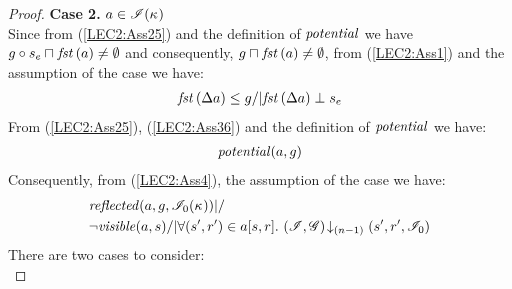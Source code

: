 \begin{lemma}
\begin{proof}
\noindent\textbf{Case 2. }$a \in \mathscr{I}(\kappa_{})$\\
Since from (\ref{LEC2:Ass25}) and the definition of $\mathit{potential}$ we have $g \circ s_e \sqcap_{} \mathit{fst}\left(a\right) \not= \emptyset$ and consequently, $g \sqcap_{} \mathit{fst}\left(a\right) \not= \emptyset$, from (\ref{LEC2:Ass1}) and the assumption of the case we have:
%
\begin{align}
	\mathit{fst}\left(\Delta {a}\right) \leq g /| \mathit{fst}\left(\Delta {a}\right) \mathrel{\bot} s_e \label{LEC2:Ass36}
\end{align}
% 
From (\ref{LEC2:Ass25}), (\ref{LEC2:Ass36}) and the definition of $\mathit{potential}$ we have:
%
\begin{align}
	\mathit{potential}(a, g) \label{LEC2:Ass37}
\end{align}
Consequently, from (\ref{LEC2:Ass4}), the assumption of the case we have:
%
\begin{align*}
	&\mathit{reflected}(a, g, \mathscr{I}_0(\kappa_{})) |/ \\
	&\neg\mathit{visible}(a, s) /| \forall (s', r') \in a[s, r].\, \left(\mathscr{I}, \mathscr{G}\right) \!\downarrow_{(n-1)} \left(s', r', \mathscr{I}_0\right)
\end{align*}
%
There are two cases to consider:\\


\end{proof}
\end{lemma}
